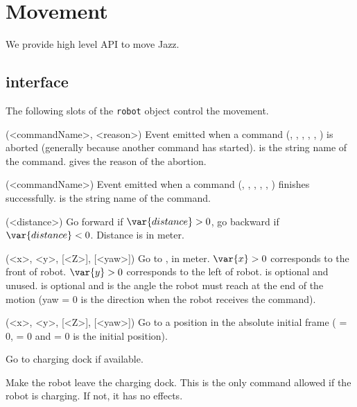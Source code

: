 \section{Movement}

We provide high level API to move Jazz.

\subsection{\us interface}
The following slots of the \lstinline{robot} object control the movement.
\begin{urbiscriptapi}[jazz]
\item[aborted?](<commandName>, <reason>)%
  Event emitted when a command (, ,
  , , ,
  ) is aborted (generally because another command
  has started).
   is the string name of the command.
   gives the reason of the abortion.

\item[finished?](<commandName>)%
  Event emitted when a command (, ,
  , , ,
  ) finishes successfully.
   is the string name of the command.

\item[go](<distance>) Go forward if $\var{distance} > 0$, go backward if
  $\var{distance} < 0$. Distance is in meter.


\item[goTo](<x>, <y>, [<Z>], [<yaw>])%
  Go to ,  in meter.  $\var{x} > 0$ corresponds to the front
  of robot. $\var{y} > 0$ corresponds to the left of robot.  is
  optional and unused.  is optional and is the angle the robot must
  reach at the end of the motion (yaw = 0 is the direction when the robot
  receives the command).


\item[goToAbsolute](<x>, <y>, [<Z>], [<yaw>])%
  Go to a position in the absolute initial frame ( = 0,  = 0
  and  = 0 is the initial position).

\item[goToChargingDock] Go to charging dock if available.

\item[leaveChargingDock] Make the robot leave the charging dock. This is
  the only command allowed if the robot is charging. If not, it has no
  effects.


\end{urbiscriptapi}
